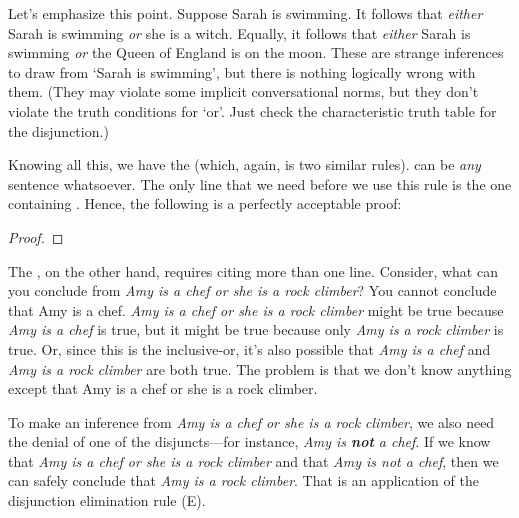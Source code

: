 Let's emphasize this point. Suppose Sarah is swimming. It follows that \emph{either} Sarah is swimming \emph{or} she is a witch. Equally, it follows that \emph{either} Sarah is swimming \emph{or} the Queen of England is on the moon. These are strange inferences to draw from `Sarah is swimming', but there is nothing logically wrong with them. (They may violate some implicit conversational norms, but they don't violate the truth conditions for `or'. Just check the characteristic truth table for the disjunction.)

Knowing all this, we have the  (which, again, is two similar rules).
\factoidbox{\begin{proof}
	\have[m]{a}{\meta{A}}
	\have[\ ]{ab}{\meta{A}\eor\meta{B}}\oi{a}
\end{proof}
\begin{proof}
	\have[m]{a}{\meta{A}}
	\have[\ ]{ba}{\meta{B}\eor\meta{A}}\oi{a}
\end{proof}}
\noindent {} can be \emph{any} sentence whatsoever. The only line that we need before we use this rule is the one containing . Hence, the following is a perfectly acceptable proof:
\begin{proof}
	 
\end{proof}

The , on the other hand, requires citing more than one line. Consider, what can you conclude from \textit{Amy is a chef or she is a rock climber}? You cannot conclude that Amy is a chef. \textit{Amy is a chef or she is a rock climber} might be true because \textit{Amy is a chef} is true, but it might be true because only \textit{Amy is a rock climber} is true. Or, since this is the inclusive-or, it's also possible that \textit{Amy is a chef} and \textit{Amy is a rock climber} are both true. The problem is that we don't know anything except that Amy is a chef or she is a rock climber. 

To make an inference from \textit{Amy is a chef or she is a rock climber}, we also need the denial of one of the disjuncts---for instance, \textit{Amy is \textbf{not} a chef}. If we know that \textit{Amy is a chef or she is a rock climber} and that \textit{Amy is not a chef}, then we can safely conclude that \textit{Amy is a rock climber}. That is an application of the disjunction elimination rule ({\eor}E).

\factoidbox{
\begin{proof}
	\have[m]{ab}{\meta{A}\eor\meta{B}}
	\have[n]{nb}{\enot\meta{B}}
	\have[\ ]{a}{\meta{A}} \oe{ab,nb}
\end{proof}
\begin{proof}
	\have[m]{ab}{\meta{A}\eor\meta{B}}
	\have[n]{na}{\enot\meta{A}}
	\have[\ ]{b}{\meta{B}} \oe{ab,nb}
\end{proof}
}

